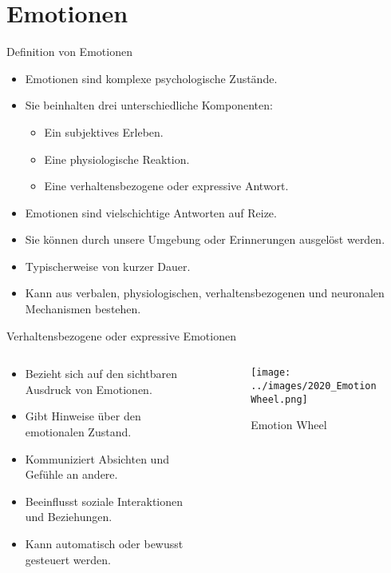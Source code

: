 \documentclass[aspectratio=169]{beamer}
\begin{document}
\section{Emotionen}
\begin{frame}{Definition von Emotionen}
  \begin{itemize}
    \item Emotionen sind komplexe psychologische Zustände.
    \item Sie beinhalten drei unterschiedliche Komponenten:
          \begin{itemize}
            \item Ein subjektives Erleben.
            \item Eine physiologische Reaktion.
            \item Eine verhaltensbezogene oder expressive Antwort.
          \end{itemize}
    \item Emotionen sind vielschichtige Antworten auf Reize.
    \item Sie können durch unsere Umgebung oder Erinnerungen ausgelöst werden.
    \item Typischerweise von kurzer Dauer.
    \item Kann aus verbalen, physiologischen, verhaltensbezogenen und neuronalen Mechanismen bestehen.
  \end{itemize}
\end{frame}

\begin{frame}{Verhaltensbezogene oder expressive Emotionen}
  \begin{columns}
    \begin{column}{0.6\textwidth}
      \begin{itemize}
        \item Bezieht sich auf den sichtbaren Ausdruck von Emotionen.
        \item Gibt Hinweise über den emotionalen Zustand.
        \item Kommuniziert Absichten und Gefühle an andere.
        \item Beeinflusst soziale Interaktionen und Beziehungen.
        \item Kann automatisch oder bewusst gesteuert werden.
      \end{itemize}
    \end{column}
    \begin{column}{0.4\textwidth}
      \begin{figure}[h]
        \centering
        \texttt{[image: ../images/2020\_EmotionWheel.png]}
        \caption{Emotion Wheel}
      \end{figure}
    \end{column}
  \end{columns}
\end{frame}
\end{document}
